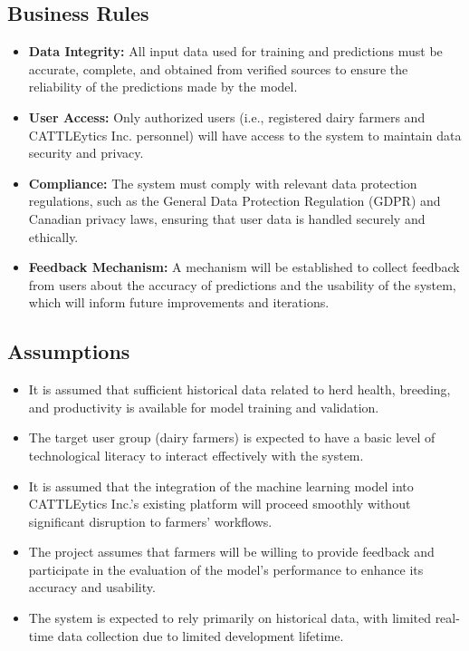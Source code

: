 \documentclass[12pt]{article}
\begin{document}
\subsection{Business Rules}
\begin{itemize}
    \item \textbf{Data Integrity:} All input data used for training and 
    predictions must be accurate, complete, and obtained from verified sources 
    to ensure the reliability of the predictions made by the model.
    \item \textbf{User Access:} Only authorized users (i.e., registered dairy 
    farmers and CATTLEytics Inc. personnel) will have access to the system to 
    maintain data security and privacy.
    \item \textbf{Compliance:} The system must comply with relevant data 
    protection regulations, such as the General Data Protection Regulation 
    (GDPR) and Canadian privacy laws, ensuring that user data is handled 
    securely and ethically.
    \item \textbf{Feedback Mechanism:} A mechanism will be established to 
    collect feedback from users about the accuracy of predictions and the 
    usability of the system, which will inform future improvements and 
    iterations.
\end{itemize}

\subsection{Assumptions}
\begin{itemize}
    \item It is assumed that sufficient historical data related to herd health, 
    breeding, and productivity is available for model training and validation.
    \item The target user group (dairy farmers) is expected to have a basic 
    level of technological literacy to interact effectively with the system.
    \item It is assumed that the integration of the machine learning model into 
    CATTLEytics Inc.'s existing platform will proceed smoothly without 
    significant disruption to farmers' workflows.
    \item The project assumes that farmers will be willing to provide feedback 
    and participate in the evaluation of the model's performance to enhance its 
    accuracy and usability.
    \item The system is expected to rely primarily on historical data, with 
    limited real-time data collection due to limited development lifetime.
\end{itemize}
\end{document}
